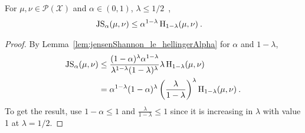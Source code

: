 \begin{corollary}
  \label{cor:jensenShannon_le_hellingerAlpha_of_le_half}
  For $\mu, \nu \in \mathcal P(\mathcal X)$ and $\alpha \in (0,1)$, $\lambda \le 1/2$~,
  \begin{align*}
  \operatorname{JS}_\alpha(\mu, \nu)
  &\le \alpha^{1 - \lambda} \operatorname{H}_{1 - \lambda}(\mu, \nu)
  \: .
  \end{align*}
\end{corollary}

\begin{proof}%
{}
By Lemma~\ref{lem:jensenShannon_le_hellingerAlpha} for $\alpha$ and $1 - \lambda$,
\begin{align*}
\operatorname{JS}_\alpha(\mu, \nu)
&\le \frac{(1 - \alpha)^{\lambda} \alpha^{1 - \lambda}}{\lambda^{1 - \lambda} (1 - \lambda)^\lambda} \lambda \operatorname{H}_{1 - \lambda}(\mu, \nu)
\\
&= \alpha^{1 - \lambda} (1 - \alpha)^\lambda \left(\frac{\lambda}{1 - \lambda}\right)^\lambda \operatorname{H}_{1 - \lambda}(\mu, \nu)
\: .
\end{align*}
To get the result, use $1 - \alpha \le 1$ and $\frac{\lambda}{1 - \lambda} \le 1$ since it is increasing in $\lambda$ with value 1 at $\lambda = 1/2$.

\end{proof}